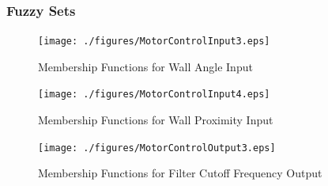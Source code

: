 \documentclass[11pt]{article}
\begin{document}
\subsubsection{Fuzzy Sets}


\begin{figure}[H]
    \centering
\texttt{[image: ./figures/MotorControlInput3.eps]}
\caption{Membership Functions for Wall Angle Input}
\end{figure}

\begin{figure}[H]
    \centering
\texttt{[image: ./figures/MotorControlInput4.eps]}
\caption{Membership Functions for Wall Proximity Input}
\end{figure}




\begin{figure}
    \centering
\texttt{[image: ./figures/MotorControlOutput3.eps]}
\caption{Membership Functions for Filter Cutoff Frequency Output}
\end{figure}
\end{document}

